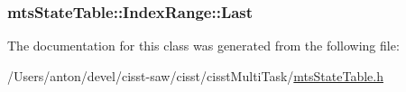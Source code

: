 \subsubsection[{Last}]{ mts\+State\+Table\+::\+Index\+Range\+::\+Last}\label{classmts_state_table_1_1_index_range_aa356fdcec51fde7c65c44e768d68258f}


The documentation for this class was generated from the following file\+:\begin{DoxyCompactItemize}
\item 
/\+Users/anton/devel/cisst-\/saw/cisst/cisst\+Multi\+Task/\hyperlink{mts_state_table_8h}{mts\+State\+Table.\+h}\end{DoxyCompactItemize}
